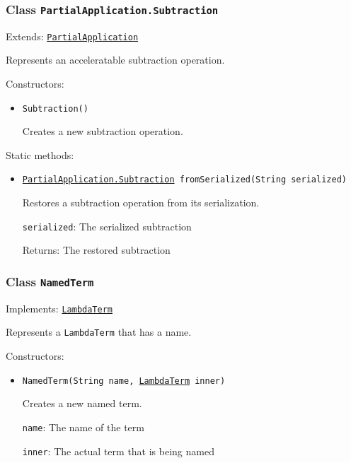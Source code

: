 \subsubsection{Class \texttt{PartialApplication.Subtraction}}
\label{type:edu.kit.wavelength.client.model.term.PartialApplication.Subtraction}
Extends: \texttt{\hyperref[type:edu.kit.wavelength.client.model.term.PartialApplication]{PartialApplication}}

Represents an acceleratable subtraction operation.

Constructors:
\begin{itemize}
\item \texttt{Subtraction()}

Creates a new subtraction operation.

\end{itemize}

Static methods:
\begin{itemize}
\item \texttt{\hyperref[type:edu.kit.wavelength.client.model.term.PartialApplication.Subtraction]{PartialApplication.Subtraction} fromSerialized(String serialized)}

Restores a subtraction operation from its serialization.

\texttt{serialized}: The serialized subtraction

Returns: The restored subtraction

\end{itemize}

\subsubsection{Class \texttt{NamedTerm}}
\label{type:edu.kit.wavelength.client.model.term.NamedTerm}
Implements: \texttt{\hyperref[type:edu.kit.wavelength.client.model.term.LambdaTerm]{LambdaTerm}}

Represents a \texttt{LambdaTerm} that has a name.

Constructors:
\begin{itemize}
\item \texttt{NamedTerm(String name, \hyperref[type:edu.kit.wavelength.client.model.term.LambdaTerm]{LambdaTerm} inner)}

Creates a new named term.

\texttt{name}: The name of the term

\texttt{inner}: The actual term that is being named

\end{itemize}

